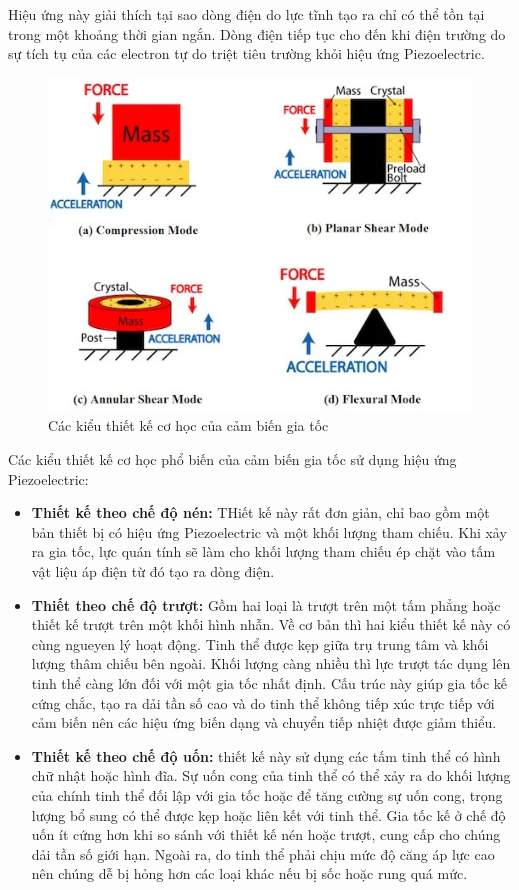 \indent Hiệu ứng này giải thích tại sao dòng điện do lực tĩnh tạo ra chỉ có thể tồn tại trong một khoảng thời gian ngắn. Dòng điện tiếp tục cho đến khi điện trường do sự tích tụ của các electron tự do triệt tiêu trường khỏi hiệu ứng Piezoelectric.
\begin{figure}[H]
    \centering
    \includegraphics[width=\textwidth,height=\textheight,keepaspectratio]{Images/Theoretical basis/intro_piezo_accelerometers_figure_2.jpeg}
    \caption{Các kiểu thiết kế cơ học của cảm biến gia tốc}
    \label{fig:piozDesin}
\end{figure}
\indent Các kiểu thiết kế cơ học phổ biến của cảm biến gia tốc sử dụng hiệu ứng Piezoelectric:
\begin{itemize}
    \item \textbf{Thiết kế theo chế độ nén:} THiết kế này rất đơn giản, chỉ bao gồm một bản thiết bị có hiệu ứng Piezoelectric và một khối lượng tham chiếu. Khi xảy ra gia tốc, lực quán tính sẽ làm cho khối lượng tham chiếu ép chặt vào tấm vật liệu áp điện từ đó tạo ra dòng điện.
    \item \textbf{Thiết theo chế độ trượt:} Gồm hai loại là trượt trên một tấm phẳng hoặc thiết kế trượt trên một khối hình nhẫn. Về cơ bản thì hai kiểu thiết kế này có cùng ngueyen lý hoạt động. Tinh thể được kẹp giữa trụ trung tâm và khối lượng thâm chiếu bên ngoài. Khối lượng càng nhiều thì lực trượt tác dụng lên tinh thể càng lớn đối với một gia tốc nhất định. Cấu trúc này giúp gia tốc kế cứng chắc, tạo ra dải tần số cao và do tinh thể không tiếp xúc trực tiếp với  cảm biến nên các hiệu ứng biến dạng và chuyển tiếp nhiệt được giảm thiểu.
    \item \textbf{Thiết kế theo chế độ uốn:} thiết kế này sử dụng các tấm tinh thể có hình chữ nhật hoặc hình đĩa. Sự uốn cong của tinh thể có thể xảy ra do khối lượng của chính tinh thể đối lập với gia tốc hoặc để tăng cường sự uốn cong, trọng lượng bổ sung có thể được kẹp hoặc liên kết với tinh thể. Gia tốc kế ở chế độ uốn ít cứng hơn khi so sánh với thiết kế nén hoặc trượt, cung cấp cho chúng dải tần số giới hạn. Ngoài ra, do tinh thể phải chịu mức độ căng áp lực cao nên chúng dễ bị hỏng hơn các loại khác nếu bị sốc hoặc rung quá mức.
\end{itemize}

